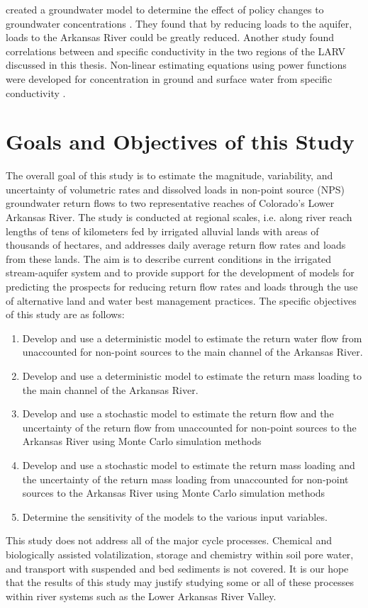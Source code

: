\textcite{Bailey2012} created a groundwater model to determine the effect of policy changes to groundwater \Se concentrations .  They found that by reducing \nitrate loads to the aquifer, \Se loads to the Arkansas River could be greatly reduced.  Another study found correlations between \Se and specific conductivity in the two regions of the LARV discussed in this thesis.  Non-linear estimating equations using power functions were developed for \Se concentration in ground and surface water from specific conductivity \parencite{2010Cody}.

\section{Goals and Objectives of this Study}
The overall goal of this study is to estimate the magnitude, variability, and uncertainty of volumetric rates and dissolved \Se loads in non-point source (NPS) groundwater return flows to two representative reaches of Colorado's Lower Arkansas River.  The study is conducted at regional scales, i.e. along river reach lengths of tens of kilometers fed by irrigated alluvial lands with areas of thousands of hectares, and addresses daily average return flow rates and \Se loads from these lands.  The aim is to describe current conditions in the irrigated stream-aquifer system and to provide support for the development of models for predicting the prospects for reducing return flow rates and \Se loads through the use of alternative land and water best management practices.  The specific objectives of this study are as follows:

\begin{enumerate}
	\item Develop and use a deterministic model to estimate the return water flow from unaccounted for non-point sources to the main channel of the Arkansas River.
	\item Develop and use a deterministic model to estimate the return \Se mass loading to the main channel of the Arkansas River.
	\item Develop and use a stochastic model to estimate the return flow and the uncertainty of the return flow from unaccounted for non-point sources to the Arkansas River using Monte Carlo simulation methods
	\item Develop and use a stochastic model to estimate the return \Se mass loading and the uncertainty of the return \Se mass loading from unaccounted for non-point sources to the Arkansas River using Monte Carlo simulation methods
	\item Determine the sensitivity of the models to the various input variables.
\end{enumerate}

This study does not address all of the major \Se cycle processes.  Chemical and biologically assisted \Se volatilization, \Se storage and chemistry within soil pore water, and \Se transport with suspended and bed sediments is not covered.  It is our hope that the results of this study may justify studying some or all of these processes within river systems such as the Lower Arkansas River Valley.

\clearpage{}